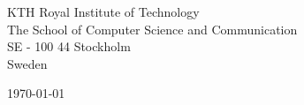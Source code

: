\begin{minipage}{0.49\textwidth}
\begin{flushleft}
  \noindent
  KTH Royal Institute of Technology\\
The School of Computer Science and Communication\\
SE - 100 44 Stockholm\\
Sweden
\end{flushleft}
\end{minipage}
\begin{minipage}{0.47\textwidth}
\begin{flushright}
\today
\end{flushright}
\end{minipage} \\

\newcommand{\univ}{KTH Royal Institute of Technology}
\newcommand{\univshort}{KTH}
\newcommand{\degree}{M.Sc.}
\newcommand{\dept}{Computer Science}
